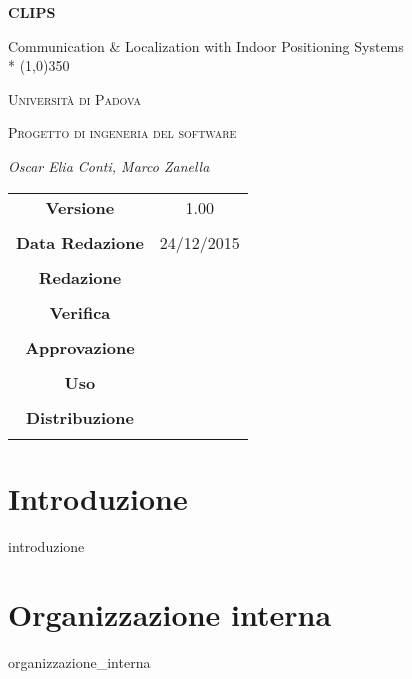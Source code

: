 \documentclass[a4paper,twoside,12pt]{article}
\author{Oscar Elia Conti, Marco Zanella}
\date{24/12/2015}
\begin{document}
\begin{titlepage}
	\centering
	{\huge\bfseries CLIPS\par}
	Communication \& Localization with Indoor Positioning Systems \\*
	\line(1,0){350} \\
	{\scshape\LARGE Università di Padova \par}
	\vspace{1cm}
	{\scshape\Large Progetto di ingeneria del software\par}
	\vspace{1.5cm}
	
	\vspace{2cm}
	{\Large\itshape Oscar Elia Conti, Marco Zanella\par}
	
	\vfill \vfill
	\begin{tabular}{c|c}
	{\hfill \textbf{Versione}} & 1.00\\ \\
	{\hfill\textbf{Data Redazione}} & 24/12/2015  \\ \\
	{\hfill\textbf{Redazione}} &  \\ \\
	{\hfill\textbf{Verifica}} &  \\ \\
	{\hfill\textbf{Approvazione}} &  \\ \\
	{\hfill\textbf{Uso}} & \\ \\
	{\hfill\textbf{Distribuzione}} & \\ \\
	\end{tabular}
\end{titlepage}
	
	\newpage

	\tableofcontents

	\newpage
	
	\newpage
	\section{Introduzione}
		{introduzione}


	\newpage
	\section{Organizzazione interna}
		{organizzazione_interna}
	
\end{document}
